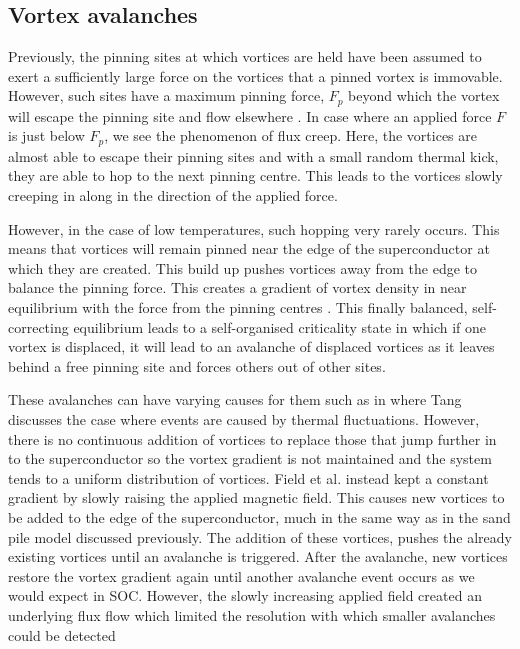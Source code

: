 \documentclass{article}
\numberwithin{equation}{section}
\begin{document}
\subsection{Vortex avalanches}
Previously, the pinning sites at which vortices are held have been assumed to exert a sufficiently large force on the vortices that a pinned vortex is immovable. However, such sites have a maximum pinning force, $F_p$ beyond which the vortex will escape the pinning site and flow elsewhere \cite{Poole2014Superconductivity}. In case where an applied force $F$ is just below $F_p$, we see the phenomenon of flux creep. Here, the vortices are almost able to escape their pinning sites and with a small random thermal kick, they are able to hop to the next pinning centre. This leads to the vortices slowly creeping in along in the direction of the applied force.

However, in the case of low temperatures, such hopping very rarely occurs. This means that vortices will remain pinned near the edge of the superconductor at which they are created. This build up pushes vortices away from the edge to balance the pinning force. This creates a gradient of vortex density in near equilibrium with the force from the pinning centres \cite{Tang1993SOCState}. This finally balanced, self-correcting equilibrium leads to a self-organised criticality state in which if one vortex is displaced, it will lead to an avalanche of displaced vortices as it leaves behind a free pinning site and forces others out of other sites.

These avalanches can have varying causes for them such as in \cite{Tang1993SOCState} where Tang discusses the case where events are caused by thermal fluctuations. However, there is no continuous addition of vortices to replace those that jump further in to the superconductor so the vortex gradient is not maintained and the system tends to a uniform distribution of vortices. Field et al. \cite{Field1995SuperconductingAvalanches} instead kept a constant gradient by slowly raising the applied magnetic field. This causes new vortices to be added to the edge of the superconductor, much in the same way as in the sand pile model discussed previously. The addition of these vortices, pushes the already existing vortices until an avalanche is triggered. After the avalanche, new vortices restore the vortex gradient again until another avalanche event occurs as we would expect in SOC. However, the slowly increasing applied field created an underlying flux flow which limited the resolution with which smaller avalanches could be detected
\end{document}
